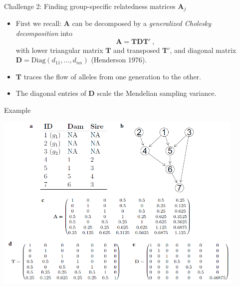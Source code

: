 \documentclass[10pt,ignorenonframetext,]{beamer}
\providecommand{\tightlist}{%
  \setlength{\itemsep}{0pt}\setlength{\parskip}{0pt}}
\begin{document}
\begin{frame}

\begin{block}{Challenge 2: Finding group-specific relatedness matrices
\(\mathbf{A}_j\)}

\vspace{3mm}

\begin{itemize}
\tightlist
\item
  First we recall: \(\mathbf{A}\) can be decomposed by a
  \emph{generalized Cholesky decomposition} into\\
  \[
  \mathbf{A} = \mathbf{T} \mathbf{D} \mathbf{T}' \ ,
  \] with lower triangular matrix \(\mathbf{T}\) and transposed
  \(\mathbf{T}'\), and diagonal matrix
  \(\mathbf{D}=\text{Diag}(d_{11},\ldots , d_{nn})\) (Henderson 1976).
\end{itemize}

\vspace{3mm}

\begin{itemize}
\tightlist
\item
  \(\mathbf{T}\) traces the flow of alleles from one generation to the
  other.
\end{itemize}

\vspace{3mm}

\begin{itemize}
\tightlist
\item
  The diagonal entries of \(\mathbf{D}\) scale the Mendelian sampling
  variance.
\end{itemize}

\end{block}

\end{frame}

\begin{frame}

\begin{block}{Example}

\vspace{3mm}

\includegraphics[width=0.9\textwidth,height=\textheight]{graphics/pedigree_matrices.png}

\end{block}

\end{frame}
\end{document}
